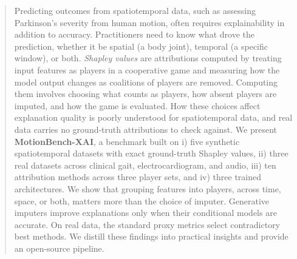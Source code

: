 \begin{abstract}
Predicting outcomes from spatiotemporal data, such as assessing Parkinson's severity from human motion, often requires explainability in addition to accuracy. Practitioners need to know what drove the prediction, whether it be spatial (a body joint), temporal (a specific window), or both. \textit{Shapley values} are attributions computed by treating input features as players in a cooperative game and measuring how the model output changes as coalitions of players are removed. Computing them involves choosing what counts as players, how absent players are imputed, and how the game is evaluated. How these choices affect explanation quality is poorly understood for spatiotemporal data, and real data carries no ground-truth attributions to check against. 
We present \textbf{MotionBench-XAI}, a benchmark built on i) five synthetic spatiotemporal datasets with exact ground-truth Shapley values, ii) three real datasets across clinical gait, electrocardiogram, and audio, iii) ten attribution methods across three player sets, and iv) three trained architectures.
We show that grouping features into players, across time, space, or both, matters more than the choice of imputer. Generative imputers improve explanations only when their conditional models are accurate. On real data, the standard proxy metrics select contradictory best methods. We distill these findings into practical insights and provide an open-source pipeline.
\end{abstract}


